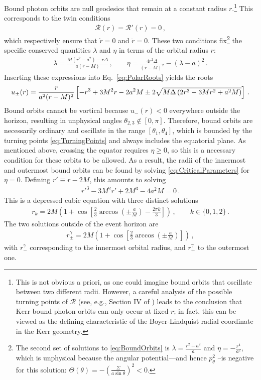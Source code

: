 \documentclass[graybox,envcountchap]{svmult}
\newcommand{\br}[1]{\left[#1\right]}
\newcommand{\pa}[1]{\left(#1\right)}
\begin{document}
Bound photon orbits are null geodesics that remain at a constant radius $r$.\footnote{This is not obvious a priori, as one could imagine bound orbits that oscillate between two different radii.
However, a careful analysis of the possible turning points of $\mathcal{R}$ (see, e.g., Section IV of \cite{GrallaLupsasca2020b}) leads to the conclusion that Kerr bound photon orbits can only occur at fixed $r$; in fact, this can be viewed as the defining characteristic of the Boyer-Lindquist radial coordinate in the Kerr geometry.}
This corresponds to the twin conditions
\begin{align}
    \label{eq:BoundOrbits}
    \mathcal{R}(r)=\mathcal{R}'(r)=0\,,
\end{align}
which respectively ensure that $\dot{r}=0$ and $\ddot{r}=0$.
These two conditions fix\footnote{The second set of solutions to \eqref{eq:BoundOrbits} is $\lambda=\frac{r^2+a^2}{a}$ and $\eta=-\frac{r^4}{a^2}$, which is unphysical because the angular potential---and hence $p_\theta^2$ --is negative for this solution: $\Theta(\theta)=-\pa{\frac{\Sigma}{a\sin{\theta}}}^2<0$.} the specific conserved quantities $\lambda$ and $\eta$ in terms of the orbital radius $r$:
\begin{align}
    \label{eq:CriticalParameters}
    \lambda=\frac{M\pa{r^2-a^2}-r\Delta}{a(r-M)}\,,\qquad
    \eta=\frac{4r^2\Delta}{(r-M)^2}-\pa{\lambda-a}^2\,. 
\end{align}
Inserting these expressions into Eq.~\eqref{eq:PolarRoots} yields the roots
\begin{align}
    u_\pm(r)=\frac{r}{a^2(r-M)^2}\br{-r^3+3M^2r-2a^2M\pm2\sqrt{M\Delta\pa{2r^3-3Mr^2+a^2M}}}\,.\notag
\end{align}
Bound orbits cannot be vortical because $u_-(r)<0$ everywhere outside the horizon, resulting in unphysical angles $\theta_{2,3}\notin\br{0,\pi}$.
Therefore, bound orbits are necessarily ordinary and oscillate in the range $\br{\theta_1,\theta_4}$, which is bounded by the turning points \eqref{eq:TurningPoints} and always includes the equatorial plane.
As mentioned above, crossing the equator requires $\eta\geq0$, so this is a necessary condition for these orbits to be allowed.
As a result, the radii of the innermost and outermost bound orbits can be found by solving \eqref{eq:CriticalParameters} for $\eta=0$.
Defining $r'\equiv r-2M$, this amounts to solving
\begin{align}
    r'^3-3M^2r'+2M^3-4a^2M=0\,.
\end{align}
This is a depressed cubic equation with three distinct solutions
\begin{align}
    r_k=2M\pa{1+\cos\br{\frac23\arccos\pa{\pm\frac{a}{M}}-\frac{2\pi k}{3}}}\,,\qquad
    k\in\{0,1,2\}\,.
\end{align}
The two solutions outside of the event horizon are
\begin{align}
    r_\pm^\gamma=2M\pa{1+\cos\br{\frac{2}{3}\arccos\pa{\pm\frac{a}{M}}}}\,,
\end{align}
with $r_-^\gamma$ corresponding to the innermost orbital radius, and $r_+^\gamma$ to the outermost one.
\end{document}
